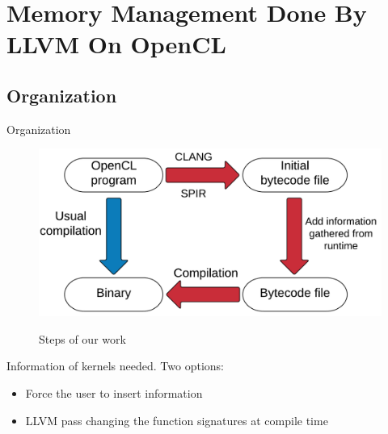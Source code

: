 \documentclass{beamer}
\begin{document}
\section{Memory Management Done By LLVM On OpenCL}

\subsection{Organization}
\begin{frame}{Organization}

\begin{figure}[ht]
    \center
    \includegraphics[width=0.6\linewidth]{steps.png}
    \label{Steps}
    \caption{Steps of our work}
\end{figure}

Information of kernels needed. Two options: 
\begin{itemize}
\item Force the user to insert information
\item LLVM pass changing the function signatures at compile time
\end{itemize}
\end{frame}
\end{document}
